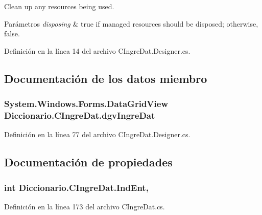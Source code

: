 Clean up any resources being used. 


\begin{DoxyParams}{Parámetros}
{\em disposing} & true if managed resources should be disposed; otherwise, false.\\
\hline
\end{DoxyParams}


Definición en la línea 14 del archivo C\-Ingre\-Dat.\-Designer.\-cs.



\subsection{Documentación de los datos miembro}
\hypertarget{class_diccionario_1_1_c_ingre_dat_a5a906b43b145397bd16d4c58416c8136}{
\subsubsection[{dgv\-Ingre\-Dat}]{\setlength{\rightskip}{0pt plus 5cm}System.\-Windows.\-Forms.\-Data\-Grid\-View Diccionario.\-C\-Ingre\-Dat.\-dgv\-Ingre\-Dat}}\label{class_diccionario_1_1_c_ingre_dat_a5a906b43b145397bd16d4c58416c8136}


Definición en la línea 77 del archivo C\-Ingre\-Dat.\-Designer.\-cs.



\subsection{Documentación de propiedades}
\hypertarget{class_diccionario_1_1_c_ingre_dat_a88346d52d51ff76cc6147408e8c4f1f8}{
\subsubsection[{Ind\-Ent}]{\setlength{\rightskip}{0pt plus 5cm}int Diccionario.\-C\-Ingre\-Dat.\-Ind\-Ent\hspace{0.3cm}{\ttfamily [get]}, {\ttfamily [set]}}}\label{class_diccionario_1_1_c_ingre_dat_a88346d52d51ff76cc6147408e8c4f1f8}


Definición en la línea 173 del archivo C\-Ingre\-Dat.\-cs.

